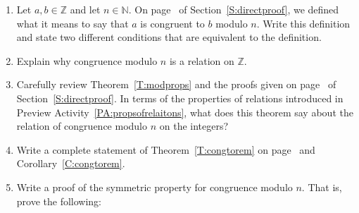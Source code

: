 \hbreak
%
\pagebreak
\begin{previewactivity}\label{PA:reviewofcongruence} \hfill
\begin{enumerate}
\item Let  $a, b \in \mathbb{Z}$ and let  $n \in \mathbb{N}$.  On page~\pageref{congruence} of Section~\ref{S:directproof}, we defined what it means to say that  $a$  is congruent to  $b$  modulo  $n$.  Write this definition and state two different conditions that are equivalent to the definition.

\item %
Explain why congruence modulo  $n$  is a relation on  $\mathbb{Z}$.

\item Carefully review Theorem~\ref{T:modprops} and the proofs given on page~\pageref{T:modprops} of Section~\ref{S:directproof}.  In terms of the properties of relations introduced in Preview Activity~\ref{PA:propsofrelaitons}, what does this theorem say about the relation of congruence modulo  $n$  on the integers?

\item Write a complete statement of Theorem~\ref{T:congtorem} on page~\pageref{T:congtorem} and Corollary~\ref{C:congtorem}.

\item Write a proof of the symmetric property for congruence modulo  $n$.  That is, prove the following:


\end{enumerate}
\end{previewactivity}
\hbreak




\endinput


\begin{center}
\setlength{\unitlength}{0.5cm}
\begin{picture}(8,8)
\put(2,2){\circle*{.25}}
\put(2,6){\circle*{.25}}
\put(6,2){\circle*{.25}}
\put(6,6){\circle*{.25}}

\put(1.8,1.2){3}
\put(5.8,1.2){4}
\put(5.8,6.4){2}
\put(1.6,6.3){1}

\put(2.3,5.8){\vector(1,0){3.4}}
\put(5.7,6.2){\vector(-1,0){3.4}}
\put(2.2,2.2){\vector(1,1){3.4}}
\put(2,5.7){\vector(0, -1){3.4}}

\put(6,1){\circle{2}}
\put(6,2){\vector(1,0){0}}

\put(1.3,6.7){\circle{2}}
\put(2,6){\vector(1,1){0}}

\end{picture}
\end{center}

